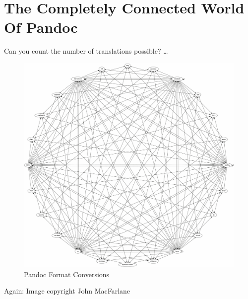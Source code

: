 \documentclass[oneside,]{memoir}
\makeatletter
\def\maxwidth{\ifdim\Gin@nat@width>\linewidth\linewidth
\else\Gin@nat@width\fi}
\let\Oldincludegraphics\includegraphics
\renewcommand{\includegraphics}[1]{\Oldincludegraphics[width=\maxwidth]{#1}}
\makeatother
\begin{document}
\section{The Completely Connected World Of Pandoc}

Can you count the number of translations possible? \ldots{}

\begin{figure}[htbp]
\centering
\includegraphics{rez/diagram.png}
\caption{Pandoc Format Conversions}
\end{figure}

Again: Image copyright John MacFarlane
\end{document}
